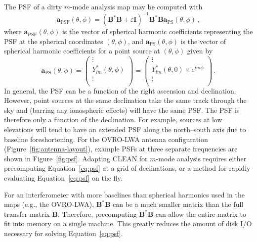 \documentclass[twocolumn]{aastex61}
\renewcommand{\b}{\pmb}
\begin{document}
The PSF of a dirty $m$-mode analysis map may be computed with
\begin{equation}\label{eq:psf}
    \b a_\text{PSF}(\theta, \phi)
        = (\b B^*\b B + \varepsilon\b I)^{-1}\b B^*\b B\b a_\text{PS}(\theta, \phi)\,,
\end{equation}
where $\b a_\text{PSF}(\theta, \phi)$ is the vector of spherical harmonic coefficients representing
the PSF at the spherical coordinates $(\theta, \phi)$, and $\b a_\text{PS}(\theta, \phi)$ is the
vector of spherical harmonic coefficients for a point source at $(\theta, \phi)$ given by
\begin{equation}
    \b a_\text{PS}(\theta, \phi) = \begin{pmatrix}
        \vdots \\
        Y_{lm}^*(\theta, \phi) \\
        \vdots \\
    \end{pmatrix}
    = \begin{pmatrix}
        \vdots \\
        Y_{lm}^*(\theta, 0)\times e^{im\phi} \\
        \vdots \\
    \end{pmatrix} \,.
\end{equation}
In general, the PSF can be a function of the right ascension and declination. However, point sources
at the same declination take the same track through the sky and (barring any ionospheric effects)
will have the same PSF. The PSF is therefore only a function of the declination. For example,
sources at low elevations will tend to have an extended PSF along the north--south axis due to
baseline foreshortening. For the OVRO-LWA antenna configuration (Figure~\ref{fig:antenna-layout}),
example PSFs at three separate frequencies are shown in Figure~\ref{fig:psf}.  Adapting CLEAN for
$m$-mode analysis requires either precomputing Equation~\ref{eq:psf} at a grid of declinations, or
a method for rapidly evaluating Equation~\ref{eq:psf} on the fly.

For an interferometer with more baselines than spherical harmonics used in the maps (e.g., the
OVRO-LWA), $\b B^*\b B$ can be a much smaller matrix than the full transfer matrix $\b B$.
Therefore, precomputing $\b B^*\b B$ can allow the entire matrix to fit into memory on a single
machine. This greatly reduces the amount of disk I/O necessary for solving Equation~\ref{eq:psf}.
\end{document}
